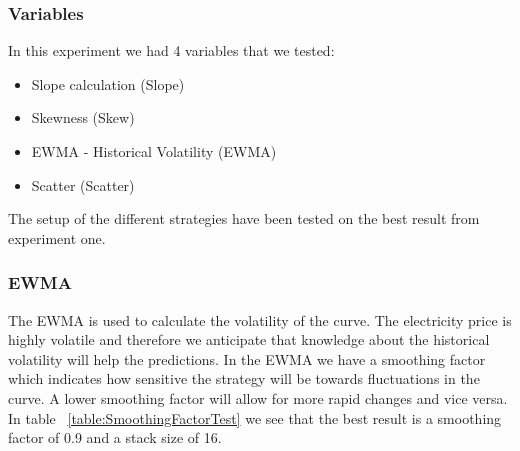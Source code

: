 \subsubsection{Variables}
In this experiment we had 4 variables that we tested:
\begin{itemize}
	\item Slope calculation (Slope)
	\item Skewness (Skew)
	\item EWMA - Historical Volatility (EWMA)
	\item Scatter (Scatter)
\end{itemize}

The setup of the different strategies have been tested on the best result from experiment one.

\subsubsection{EWMA}
\begin{table}[H]
\centering  %
\caption{Smoothing factor test} %
\label{table:SmoothingFactorTest} %
\end{table}

The EWMA is used to calculate the volatility of the curve. The electricity price is highly volatile and therefore we anticipate that knowledge about the historical volatility will help the predictions. In the EWMA we have a smoothing factor which indicates how sensitive the strategy will be towards fluctuations in the curve. A lower smoothing factor will allow for more rapid changes and vice versa. In table ~\ref{table:SmoothingFactorTest} we see that the best result is a smoothing factor of 0.9 and a stack size of 16.


